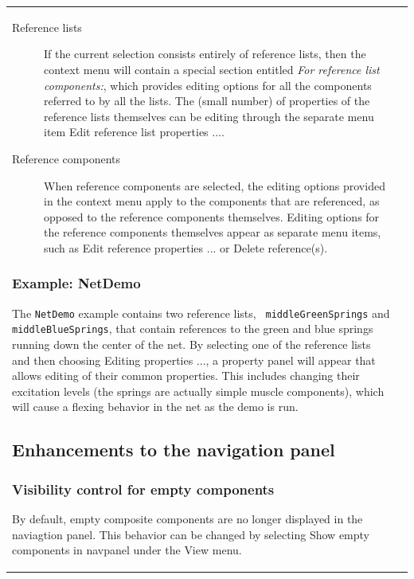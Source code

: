 \documentclass{article}
\begin{document}
\begin{tabular}{ll}
\begin{description}

\item[Reference lists] If the current selection consists entirely of
reference lists, then the context menu will contain a special section
entitled {\it For reference list components:}, which provides editing
options for all the components referred to by all the lists. The
(small number) of properties of the reference lists themselves can be
editing through the separate menu item {\sf Edit reference list
properties ...}.

\item[Reference components] When reference components are selected,
the editing options provided in the context menu apply to the
components that are referenced, as opposed to the reference components
themselves. Editing options for the reference components themselves
appear as separate menu items, such as {\sf Edit reference properties
...} or {\sf Delete reference(s)}.

\end{description}

\subsubsection*{Example: NetDemo}

The {\tt NetDemo} example contains two reference lists, {\tt
middleGreenSprings} and {\tt middleBlueSprings}, that contain
references to the green and blue springs running down the center of
the net. By selecting one of the reference lists and then choosing
{\sf Editing properties ...}, a property panel will appear that allows
editing of their common properties.  This includes changing their
excitation levels (the springs are actually simple muscle components),
which will cause a flexing behavior in the net as the demo is run.

\subsection*{Enhancements to the navigation panel}

\subsubsection*{Visibility control for empty components}

By default, empty composite components are no longer displayed in the
naviagtion panel. This behavior can be changed by selecting {\sf Show
empty components in navpanel} under the {\sf View} menu.


\end{tabular}
\end{document}
